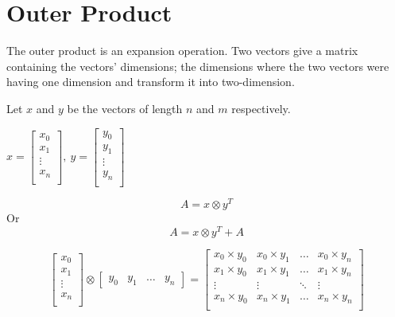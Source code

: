 \chapter{Outer Product}

The outer product is an expansion operation. 
Two vectors give a matrix containing the vectors' dimensions; 
the dimensions where the two vectors were having one dimension and transform it into two-dimension.


Let $x$ and $y$ be the vectors of length $n$ and $m$ respectively.

\vspace*{0.5 cm}
$x = 
\begin{bmatrix}
    x_0 \\    
    x_1 \\    
    \vdots \\
    x_n \\    
\end{bmatrix}
,\ y = 
\begin{bmatrix}
    y_0 \\    
    y_1 \\    
    \vdots \\
    y_n \\    
\end{bmatrix}
$

\begin{equation}
    A = x \otimes y^T
    \label{eq:org_outer_prod}
\end{equation}
Or
\begin{equation}
    A = x \otimes y^T + A
    \label{eq:outer_prod}
\end{equation}

\[
\begin{bmatrix}
    x_0 \\    
    x_1 \\    
    \vdots \\
    x_n \\    
\end{bmatrix}
\otimes 
\begin{bmatrix}
    y_0 &   y_1 &    \dots &   y_n
\end{bmatrix}
=
\begin{bmatrix}
    x_0 \times y_0  & x_0 \times y_1    & \dots     & x_0 \times y_n \\
    x_1 \times y_0  & x_1 \times y_1    & \dots     & x_1 \times y_n \\
    \vdots          & \vdots            & \ddots    & \vdots \\
    x_n \times y_0  & x_n \times y_1    & \dots     & x_n \times y_n \\
\end{bmatrix}
\]

